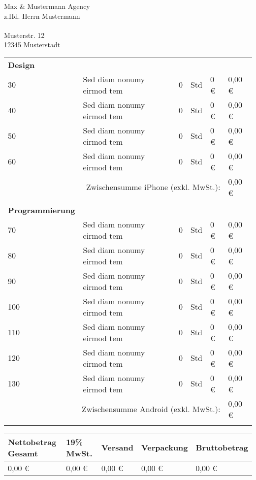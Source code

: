 \documentclass[DIN, pagenumber=footmiddle, parskip=half,
	fromalign=right,  %
	fromphone=true, fromfax=false,
	fromrule=false]{scrlttr2}
\begin{document}
\begin{letter}{
	Max \& Mustermann Agency\\
	z.Hd. Herrn Mustermann\\ \ \\
	Musterstr. 12\\
	12345 Musterstadt
}
\begin{longtable}{p{2.5cm}p{5.5cm}p{1cm}p{1cm}p{2.5cm}p{2.5cm}}
	\textbf{Design}\\
	30 & Sed diam nonumy eirmod tem & 0 & Std & 0 \euro{} & 0,00 \euro{}\\
	40 & Sed diam nonumy eirmod tem & 0 & Std & 0 \euro{} & 0,00 \euro{}\\
	50 & Sed diam nonumy eirmod tem & 0 & Std & 0 \euro{} & 0,00 \euro{}\\
	60 & Sed diam nonumy eirmod tem & 0 & Std & 0 \euro{} & 0,00 \euro{}\\
	\multicolumn{5}{r}{Zwischensumme iPhone (exkl. MwSt.):} & 0,00 \euro{}\\
	\\

	\textbf{Programmierung}\\
	70 & Sed diam nonumy eirmod tem & 0 & Std & 0 \euro{} & 0,00 \euro{}\\
	80 & Sed diam nonumy eirmod tem & 0 & Std & 0 \euro{} & 0,00 \euro{}\\
	90 & Sed diam nonumy eirmod tem & 0 & Std & 0 \euro{} & 0,00 \euro{}\\
	100 & Sed diam nonumy eirmod tem & 0 & Std & 0 \euro{} & 0,00 \euro{}\\
	110 & Sed diam nonumy eirmod tem & 0 & Std & 0 \euro{} & 0,00 \euro{}\\
	120 & Sed diam nonumy eirmod tem & 0 & Std & 0 \euro{} & 0,00 \euro{}\\
	130 & Sed diam nonumy eirmod tem & 0 & Std & 0 \euro{} & 0,00 \euro{}\\
	\multicolumn{5}{r}{Zwischensumme Android (exkl. MwSt.):} & 0,00 \euro{}\\
	\\

	\hline\hline
\end{longtable}

\begin{longtable}{p{5.5cm}p{2.5cm}p{2.5cm}p{2cm}p{3cm}}
	\hline Nettobetrag Gesamt & 19\% MwSt. & Versand & Verpackung & Bruttobetrag\\
	\hline
	0,00 \euro{} & 0,00 \euro & 0,00 \euro & 0,00 \euro & 0,00 \euro{}\\
	\hline\hline
\end{longtable}


\end{letter}
\end{document}
